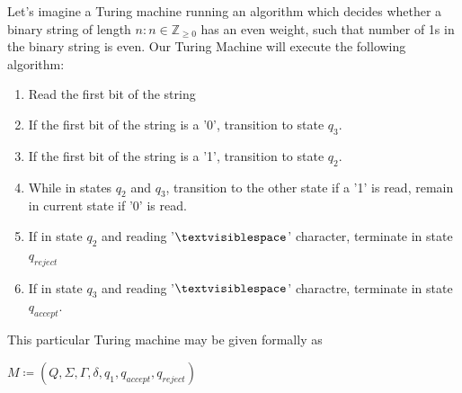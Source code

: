 \documentclass{article}
\begin{document}
\begin{exmp}
Let's imagine a Turing machine running an algorithm which decides whether a binary string of length $n : n \in \mathbb{Z}_{\geq 0}$ has an even weight, such that number of 1s in the binary string is even.  Our Turing Machine will execute the following algorithm:
\begin{enumerate}
	\item Read the first bit of the string
	\item If the first bit of the string is a '0', transition to state $q_{3}$.
	\item If the first bit of the string is a '1', transition to state $q_{2}$.
	\item While in states $q_{2}$ and $q_{3}$, transition to the other state if a '1' is read, remain in current state if '0' is read.
	\item If in state $q_{2}$ and reading '$\textvisiblespace$' character, terminate in state $q_{reject}$
	\item If in state $q_{3}$ and reading '$\textvisiblespace$' charactre, terminate in state $q_{accept}$.
\end{enumerate}
\noindent This particular Turing machine may be given formally as \\

\centerline{$M \coloneq (Q, \Sigma, \Gamma, \delta, q_{1}, q_{accept}, q_{reject})$}


\end{exmp}
\end{document}
